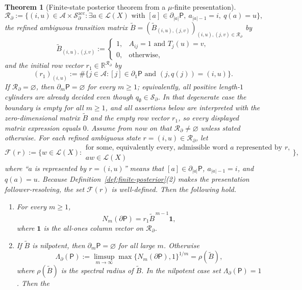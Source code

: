 \documentclass{etds}%
\numberwithin{equation}{section}
\theoremstyle{plain}
\newtheorem{theorem}{Theorem}[section]
\theoremstyle{definition}
\theoremstyle{remark}
\begin{document}
\begin{theorem}[Finite-state posterior theorem from a $\mu$-finite presentation]
\[
\mathcal{R}_\partial
:=\{(i,u)\in\mathcal{A}\times \mathcal{S}_\partial^{\mathrm{acc}}:
\exists a\in\mathcal{L}(X)\text{ with }[a]\in\partial_{|a|}\mathsf{P},
\ a_{|a|-1}=i,\ q(a)=u\},
\]
the refined ambiguous transition matrix
$\widetilde{B}
=(\widetilde{B}_{(i,u),(j,v)})_{(i,u),(j,v)\in\mathcal{R}_\partial}$ by
\[
\widetilde{B}_{(i,u),(j,v)}
:=
\begin{cases}
1,& A_{ij}=1\text{ and }T_j(u)=v,\\
0,& \text{otherwise},
\end{cases}
\]
and the initial row vector $r_1\in\mathbb{R}^{\mathcal{R}_\partial}$ by
\[
(r_1)_{(i,u)}
:=\#\{j\in\mathcal{A}:[j]\in\partial_1\mathsf{P}\text{ and }(j,q(j))=(i,u)\}.
\]
If $\mathcal{R}_\partial=\varnothing$, then $\partial_m\mathsf{P}=\varnothing$
for every $m\ge 1$; equivalently, all positive length-$1$ cylinders are already
decided even though $q_\emptyset\in\mathcal{S}_\partial$.  In that degenerate
case the boundary is empty for all $m\ge 1$, and all assertions below are
interpreted with the zero-dimensional matrix $\widetilde{B}$ and the empty row
vector $r_1$, so every displayed matrix expression equals $0$.  Assume from
now on that $\mathcal{R}_\partial\neq\varnothing$ unless stated otherwise.
For each refined ambiguous state $r=(i,u)\in\mathcal{R}_\partial$, let
\[
\mathcal{F}(r):=
\bigl\{w\in\mathcal{L}(X):
\begin{array}{l}
\text{for some, equivalently every, admissible word $a$ represented by $r$,}\\
aw\in\mathcal{L}(X)
\end{array}
\bigr\},
\]
where ``$a$ is represented by $r=(i,u)$'' means that
$[a]\in\partial_{|a|}\mathsf{P}$, $a_{|a|-1}=i$, and $q(a)=u$.  Because
  Definition~\ref{def:finite-posterior}\emph{(2)} makes the presentation
  follower-resolving, the set $\mathcal{F}(r)$ is well-defined.  Then the
  following hold.
\begin{enumerate}[label=(\arabic*)]
\item For every $m\ge 1$,
  \[
  N_m(\partial\mathsf{P})=r_1\widetilde{B}^{\,m-1}\mathbf{1},
  \]
  where $\mathbf{1}$ is the all-ones column vector on
  $\mathcal{R}_\partial$.
\item If $\widetilde{B}$ is nilpotent, then $\partial_m\mathsf{P}=\varnothing$
  for all
  large $m$.  Otherwise
  \[
  \Lambda_\partial(\mathsf{P})
  :=\limsup_{m\to\infty}\max\{N_m(\partial\mathsf{P}),1\}^{1/m}
  =\rho(\widetilde{B}),
  \]
  where $\rho(\widetilde{B})$ is the spectral radius of $\widetilde{B}$.
  In the nilpotent case set $\Lambda_\partial(\mathsf{P})=1$.  Then the

\end{enumerate}
\end{theorem}
\end{document}
